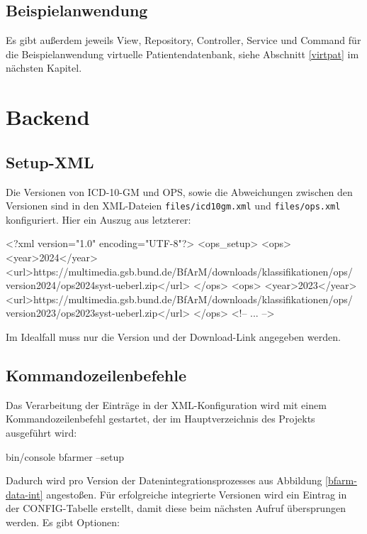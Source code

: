 \subsection{Beispielanwendung}

Es gibt außerdem jeweils View, Repository,  Controller, Service und Command für die Beispielanwendung virtuelle Patientendatenbank, siehe Abschnitt \ref{virtpat} im nächsten Kapitel. 

\section{Backend}

\subsection{Setup-XML}

Die Versionen von ICD-10-GM und OPS, sowie die Abweichungen zwischen den Versionen sind in den XML-Dateien \texttt{files/icd10gm.xml} und \texttt{files/ops.xml} konfiguriert. Hier ein Auszug aus letzterer:

\begin{Code}
<?xml version="1.0" encoding="UTF-8"?>
<ops_setup>
    <ops>
        <year>2024</year>
        <url>https://multimedia.gsb.bund.de/BfArM/downloads/klassifikationen/ops/
            version2024/ops2024syst-ueberl.zip</url>
    </ops>
    <ops>
        <year>2023</year>
        <url>https://multimedia.gsb.bund.de/BfArM/downloads/klassifikationen/ops/
            version2023/ops2023syst-ueberl.zip</url>
    </ops>
<!-- ... -->
\end{Code}

Im Idealfall muss nur die Version und der Download-Link angegeben werden. 


\subsection{Kommandozeilenbefehle}
\label{bfarm-cmd}

Das Verarbeitung der Einträge in der XML-Konfiguration wird mit einem Kommandozeilenbefehl gestartet, der im Hauptverzeichnis des Projekts ausgeführt wird:

\begin{Code}
bin/console bfarmer --setup
\end{Code}

Dadurch wird pro Version der Datenintegrationsprozesses aus Abbildung \ref{bfarm-data-int} angestoßen. Für erfolgreiche integrierte Versionen wird ein Eintrag in der CONFIG-Tabelle erstellt, damit diese beim nächsten Aufruf übersprungen werden. Es gibt Optionen:

